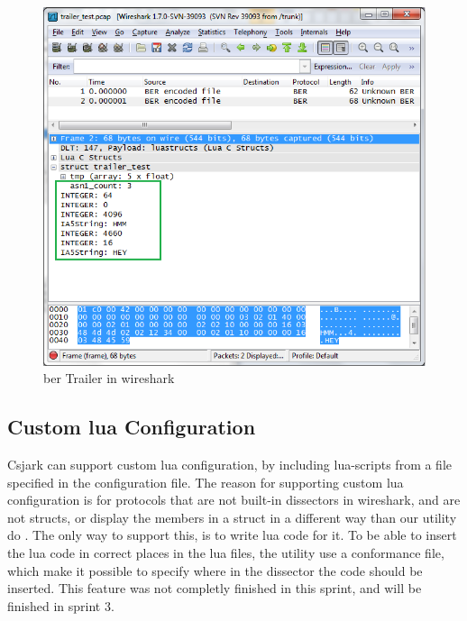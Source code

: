 \begin{figure}[ht]
	\center
	\includegraphics[width=\textwidth]{./sprints/img/wireshark_trailer}
	\caption{\gls{ber} Trailer in \Gls{wireshark}\label{fig:wstrailer}}
\end{figure}





\subsection{Custom \Gls{lua} Configuration}
Csjark can support custom \Gls{lua} configuration, by including \Gls{lua}-\glspl{script} from a 
file specified in the configuration file. The reason for supporting custom \Gls{lua} 
configuration is for protocols that are not built-in \glspl{dissector} in \Gls{wireshark}, 
and are not \glspl{struct}, or display the members in a struct in a different way 
than our utility do . The only way to support this, is to write \Gls{lua} code for 
it. To be able to insert the \Gls{lua} code in correct places in the lua files, the 
utility use a conformance file, which make it possible to specify where in the 
dissector the code should be inserted. This feature was not completly finished 
in this sprint, and will be finished in sprint 3.


